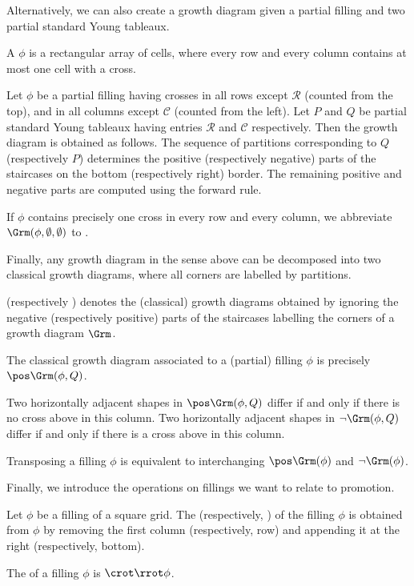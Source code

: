 Alternatively, we can also create a growth diagram given a partial
filling and two partial standard Young tableaux.
\begin{defi}
 A  $\phi$ is a rectangular array of cells,
 where every row and every column contains at most one cell with a
 cross.

 Let $\phi$ be a partial filling having crosses in all rows except
 $\mathcal R$ (counted from the top), and in all columns except
 $\mathcal C$ (counted from the left). Let $P$ and $Q$ be partial
 standard Young tableaux having entries $\mathcal R$ and
 $\mathcal C$ respectively. Then the growth diagram
  is obtained as follows. The sequence of
 partitions corresponding to $Q$ (respectively $P$) determines the
 positive (respectively negative) parts of the staircases on the
 bottom (respectively right) border. The remaining positive and
 negative parts are computed using the forward rule.

 If $\phi$ contains precisely one cross in every row and every
 column, we abbreviate $\Grm(\phi,\emptyset,\emptyset)$ to
 \Dfn{$\Grm(\phi)$}.
\end{defi}

Finally, any growth diagram in the sense above can be decomposed into
two classical growth diagrams, where all corners are labelled by
partitions.
\begin{defi}
 \Dfn{$\pos\Grm $} (respectively \Dfn{$\neg\Grm$}) denotes the
 (classical) growth diagrams obtained by ignoring the negative
 (respectively positive) parts of the staircases labelling the
 corners of a growth diagram $\Grm$.
\end{defi}
\begin{rema}
 The classical growth diagram associated to a (partial) filling $\phi$ is precisely $\pos\Grm(\phi, Q)$.
\end{rema}
\begin{rema}
 Two horizontally adjacent shapes in $\pos\Grm(\phi, Q)$ differ if and only if there is no cross above in this column. Two horizontally adjacent shapes in $\neg\Grm(\phi, Q)$ differ if and only if there is a cross above in this column.
\end{rema}
\begin{rema}\label{prop:transposed-growth}
 Transposing a filling $\phi$ is equivalent to interchanging $\pos\Grm(\phi)$ and $\neg\Grm(\phi)$.
\end{rema}

Finally, we introduce the operations on fillings we want to relate to promotion.
\begin{defi}
 Let $\phi$ be a filling of a square grid. The  (respectively, ) of the filling $\phi$ is obtained from $\phi$ by removing the first column (respectively, row) and appending it at the right (respectively, bottom).

 The  of a filling $\phi$ is $\crot\rrot\phi$.
\end{defi}


